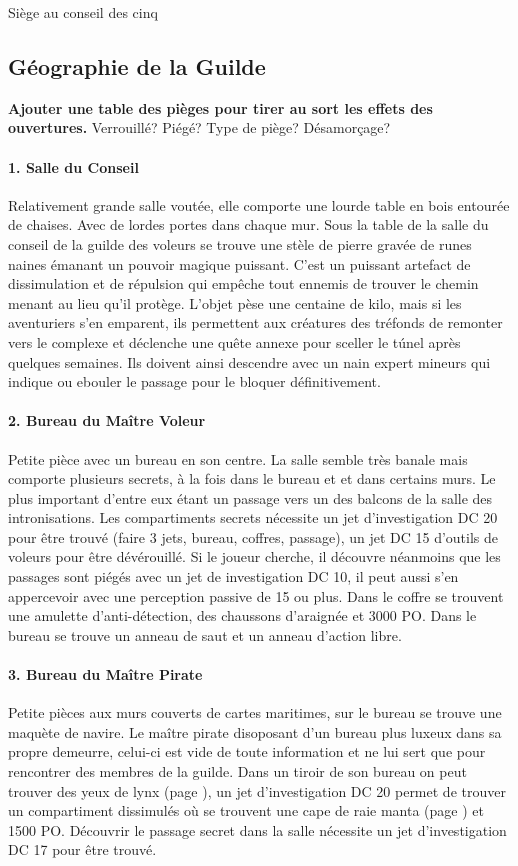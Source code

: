 Siège au conseil des cinq

\subsection{Géographie de la Guilde}

{\bf Ajouter une table des pièges pour tirer au sort les effets des ouvertures.}
Verrouillé? Piégé? Type de piège? Désamorçage?

\paragraph{1. Salle du Conseil} Relativement grande salle voutée, elle comporte une
lourde table en bois entourée de chaises. Avec de lordes portes dans chaque mur.
Sous la table de la salle du conseil de la guilde des voleurs se trouve une stèle
de pierre gravée de runes naines émanant un pouvoir magique puissant. C'est un 
puissant artefact de dissimulation et de répulsion qui empêche tout ennemis de 
trouver le chemin menant au lieu qu'il protège. L'objet pèse une centaine de kilo,
mais si les aventuriers s'en emparent, ils permettent aux créatures des tréfonds
de remonter vers le complexe et déclenche une quête annexe pour sceller le túnel
après quelques semaines. Ils doivent ainsi descendre avec un nain expert mineurs 
qui indique ou ebouler le passage pour le bloquer définitivement. 

\paragraph{2. Bureau du Maître Voleur} Petite pièce avec un bureau en son centre.
La salle semble très banale mais comporte plusieurs secrets, à la 
fois dans le bureau et et dans certains murs. Le plus important d'entre eux étant
un passage vers un des balcons de la salle des intronisations. Les compartiments
secrets nécessite un jet d'investigation DC 20 pour être trouvé (faire 3 jets, 
bureau, coffres, passage), un jet DC 15 d'outils de voleurs pour être dévérouillé.
Si le joueur cherche, il découvre néanmoins que les passages sont piégés avec un 
jet de investigation DC 10, il peut aussi s'en appercevoir avec une perception 
passive de 15 ou plus. Dans le coffre se trouvent une amulette d'anti-détection,
des chaussons d'araignée et 3000 PO. Dans le bureau se trouve un anneau de saut et
un anneau d'action libre.

\paragraph{3. Bureau du Maître Pirate} Petite pièces aux murs couverts de cartes
maritimes, sur le bureau se trouve une maquète de navire. Le maître pirate 
disoposant d'un bureau plus luxeux dans sa propre demeurre, celui-ci est vide
de toute information et ne lui sert que pour rencontrer des membres de la 
guilde. Dans un tiroir de son bureau on peut trouver des yeux de lynx (page 
\pageref{}), un jet d'investigation DC 20 permet de trouver un compartiment 
dissimulés où se trouvent une cape de raie manta (page \pageref{}) et 1500 PO.
Découvrir le passage secret dans la salle nécessite un jet d'investigation 
DC 17 pour être trouvé.


